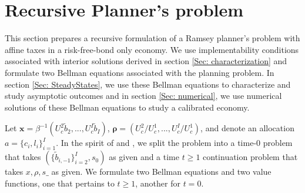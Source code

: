\documentclass[thmsb,11pt]{article}
\begin{document}
\smallskip
\section{Recursive Planner's problem } \label{Sec: Bellman Equations}

This section prepares a recursive formulation of a Ramsey planner's problem with affine taxes in a risk-free-bond only economy. We  use 
implementability conditions associated with interior solutions derived in section \ref{Sec: characterization} and formulate two  Bellman equations associated with the planning problem.
 In section \ref{Sec: SteadyStates}, we use these Bellman equations to characterize and study asymptotic outcomes  and in  section \ref{Sec: numerical}, we use numerical solutions of these Bellman equations to study a calibrated economy.


Let $\mathbf{x}= \beta^{-1}\left( U_{c}^{2}\tilde{b}_{2},...,U_{c}^{I}\tilde{b}_{I}\right)$, $\mathbf{\rho }=\left( U_{c}^{2}/U_{c}^{1},...,U_{c}^{I}/U_{c}^{1}\right) $, and denote an allocation $a=\{c_i,l_i\}^{I}_{i=1}.$
In the spirit of \cite{Kydland1980} and \cite{Farhi2010}, we split the problem into a time-0 problem that takes $(\{\tilde{b}_{i,-1}\}^{I}_{i=2}, s_0)$ as given and   a time $t \geq 1$ continuation problem  that takes $x,\rho,s\_$ as given. We formulate
two Bellman equations and two value functions, one that pertains to $t\geq 1$, another for $t=0$.
\end{document}

